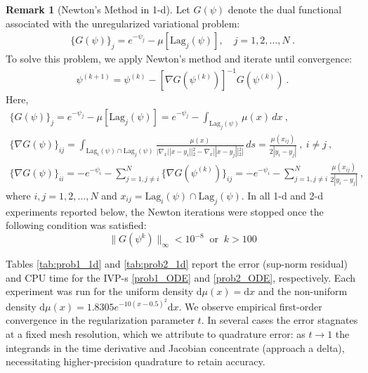 \documentclass{scrartcl}
\newcommand{\dd}{\mathrm d}
\theoremstyle{plain}
\theoremstyle{definition}
\newtheorem{rem}[thm]{Remark}
\begin{document}
\begin{rem}[Newton's Method in 1-d]\label{rem:Newton1d}
    Let \(G(\psi)\) denote the dual functional associated with the unregularized variational problem:
    \begin{gather*}
        \{G(\psi)\}_j = e^{-\psi_j} - \mu[\mathrm{Lag}_j(\psi)], \quad j = 1, 2, \dots, N\ .
    \end{gather*}
    To solve this problem, we apply Newton's method and iterate until convergence:
    \begin{gather}
        \psi^{(k+1)} = \psi^{(k)} - [\nabla G(\psi^{(k)})]^{-1} G(\psi^{(k)})\ .\label{prob5_Newton}
    \end{gather}
    Here,
    \begin{gather*}
        \{G(\psi)\}_j = e^{-\psi_j} - \mu[\mathrm{Lag}_j(\psi)]
        = e^{-\psi_j} - \int_{\mathrm{Lag}_j(\psi)} \mu(x)\,dx\ ,\\
        \{\nabla G(\psi)\}_{ij}
        = \int_{\mathrm{Lag}_i(\psi)\cap \mathrm{Lag}_j(\psi)}
        \frac{\mu(x)}{|\nabla_x ||x-y_i||_2^2 - \nabla_x ||x-y_j||_2^2|}\,ds
        = \frac{\mu(x_{ij})}{2|y_i-y_j|}\ , \ i\neq j\ ,\\
        \{\nabla G(\psi)\}_{ii}
        = -e^{-\psi_i}-\sum_{j=1,j\neq i}^N \{\nabla G(\psi^{(k)})\}_{ij}
        = -e^{-\psi_i}-\sum_{j=1,j\neq i}^N
        \frac{\mu(x_{ij})}{2|y_i-y_j|}\ ,
    \end{gather*}
    \normalsize
    where $i,j = 1,2,\dots, N$ and \(x_{ij} = \mathrm{Lag}_i(\psi)\cap \mathrm{Lag}_j(\psi)\). In all 1-d and 2-d experiments reported below, the Newton iterations were stopped once the following condition was satisfied:
    \[
    \lVert G(\psi^{k}) \rVert_{\infty} < 10^{-8}\ \text{ or }\ k>100
    \]
\end{rem}

Tables \ref{tab:prob1_1d} and \ref{tab:prob2_1d} report the error (sup-norm residual) and CPU time for the IVP-s \eqref{prob1_ODE} and \eqref{prob2_ODE}, respectively. Each experiment was run for the uniform density \(\dd\mu(x)=\dd x\) and the non-uniform density
\(
    \dd\mu(x)=1.8305e^{-10(x-0.5)^2}\dd x .
\)
We observe empirical first-order convergence in the regularization parameter \(t\). In several cases the error stagnates at a fixed mesh resolution, which we attribute to quadrature error: as \(t\to1\) the integrands in the time derivative and Jacobian concentrate (approach a delta), necessitating higher-precision quadrature to retain accuracy.
\end{document}
